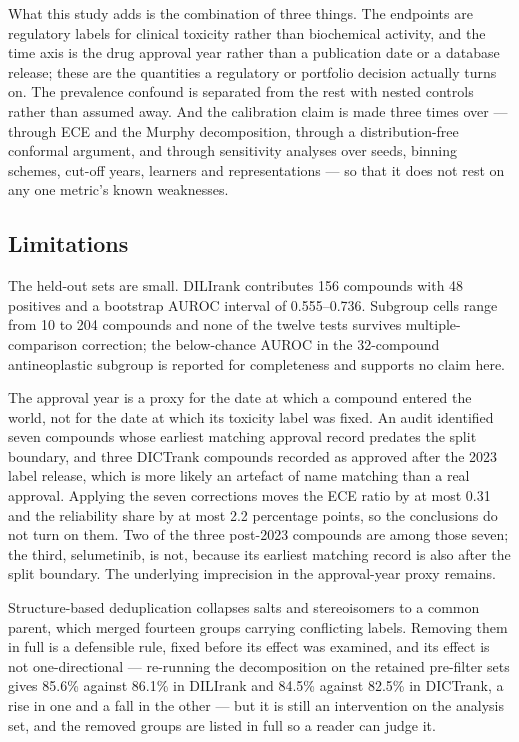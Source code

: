 What this study adds is the combination of three things. The endpoints are
regulatory labels for clinical toxicity rather than biochemical activity, and the
time axis is the drug approval year rather than a publication date or a database
release; these are the quantities a regulatory or portfolio decision actually turns
on. The prevalence confound is separated from the rest with nested controls rather
than assumed away. And the calibration claim is made three times over --- through
ECE and the Murphy decomposition, through a distribution-free conformal argument,
and through sensitivity analyses over seeds, binning schemes, cut-off years,
learners and representations --- so that it does not rest on any one metric's
known weaknesses.

\subsection{Limitations}

The held-out sets are small. DILIrank contributes 156 compounds with 48 positives
and a bootstrap AUROC interval of 0.555--0.736. Subgroup cells range from 10 to 204
compounds and none of the twelve tests survives multiple-comparison correction; the
below-chance AUROC in the 32-compound antineoplastic subgroup is reported for
completeness and supports no claim here.

The approval year is a proxy for the date at which a compound entered the world,
not for the date at which its toxicity label was fixed. An audit identified seven
compounds whose earliest matching approval record predates the split boundary, and
three DICTrank compounds recorded as approved after the 2023 label release, which
is more likely an artefact of name matching than a real approval. Applying the seven
corrections moves the ECE ratio by at most 0.31 and the reliability share by at most
2.2 percentage points, so the conclusions do not turn on them. Two of the three
post-2023 compounds are among those seven; the third, selumetinib, is not, because
its earliest matching record is also after the split boundary. The underlying
imprecision in the approval-year proxy remains.

Structure-based deduplication collapses salts and stereoisomers to a common parent,
which merged fourteen groups carrying conflicting labels. Removing them in full is
a defensible rule, fixed before its effect was examined, and its effect is not
one-directional --- re-running the decomposition on the retained pre-filter sets
gives 85.6\% against 86.1\% in DILIrank and 84.5\% against 82.5\% in DICTrank, a
rise in one and a fall in the other --- but it is still an intervention on the
analysis set, and the removed groups are listed in full so a reader can judge it.

